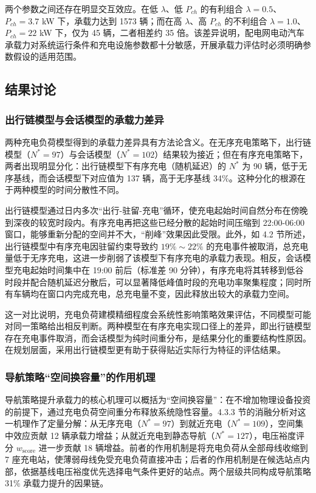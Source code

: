 \documentclass[10pt,a4paper]{article}
\numberwithin{equation}{section}
\numberwithin{table}{section}
\numberwithin{figure}{section}
\begin{document}
    两个参数之间还存在明显交互效应。在低 $\lambda$、低 $P_{ch}$ 的有利组合 $\lambda = 0.5$、$P_{ch} = 3.7$ kW 下，承载力达到 1573 辆；而在高 $\lambda$、高 $P_{ch}$ 的不利组合 $\lambda = 1.0$、$P_{ch} = 22$ kW 下，仅为 45 辆，二者相差约 35 倍。该差异说明，配电网电动汽车承载力对系统运行条件和充电设施参数都十分敏感，开展承载力评估时必须明确参数假设的适用范围。

    \subsection{结果讨论}

    \subsubsection{出行链模型与会话模型的承载力差异}

    两种充电负荷模型得到的承载力差异具有方法论含义。在无序充电策略下，出行链模型（$N^* = 97$）与会话模型（$N^* = 102$）结果较为接近；但在有序充电策略下，两者出现明显分化：出行链模型下有序充电（随机延迟）的 $N^*$ 为 90 辆，低于无序基线，而会话模型下对应值为 137 辆，高于无序基线 34\%。这种分化的根源在于两种模型的时间分散性不同。

    出行链模型通过日内多次“出行-驻留-充电”循环，使充电起始时间自然分布在傍晚到深夜的较宽时段内。有序充电再把这些已经分散的起始时间压缩到 22:00-06:00 窗口，能够重新分配的空间并不大，“削峰”效果因此受限。此外，如 4.2 节所述，出行链模型中有序充电因驻留约束导致约 $19\%\sim22\%$ 的充电事件被取消，总充电量低于无序充电，这进一步削弱了该模型下有序充电的承载力表现。相反，会话模型充电起始时间集中在 19:00 前后（标准差 90 分钟），有序充电将其转移到低谷时段并配合随机延迟分散后，可以显著降低峰值时段的充电功率聚集程度；同时所有车辆均在窗口内完成充电，总充电量不变，因此释放出较大的承载力空间。

    这一对比说明，充电负荷建模精细程度会系统性影响策略效果评估，不同模型可能对同一策略给出相反判断。两种模型在有序充电实现口径上的差异，即出行链模型存在充电事件取消，而会话模型为纯时间重分布，是结果分化的重要结构性原因。在规划层面，采用出行链模型更有助于获得贴近实际行为特征的评估结果。

    \subsubsection{导航策略“空间换容量”的作用机理}

    导航策略提升承载力的核心机理可以概括为“空间换容量”：在不增加物理设备投资的前提下，通过充电负荷空间重分布释放系统隐性容量。4.3.3 节的消融分析对这一机理作了定量分解：从无序充电（$N^* = 97$）到就近充电（$N^* = 109$），空间集中效应贡献 12 辆承载力增益；从就近充电到静态导航（$N^* = 127$），电压裕度评分 $w_{\text{score}}$ 进一步贡献 18 辆增益。前者的作用机制是将充电负荷从全部母线收缩到 7 座充电站，使薄弱母线免受充电负荷直接冲击；后者的作用机制是在候选站点内部，依据基线电压裕度优先选择电气条件更好的站点。两个层级共同构成导航策略 31\% 承载力提升的因果链。
\end{document}
